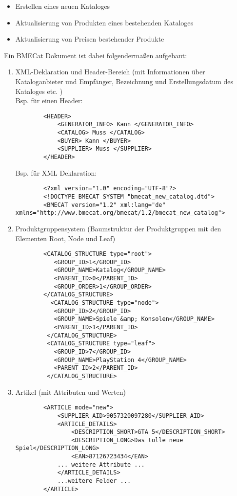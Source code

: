 \begin{itemize}
\item Erstellen eines neuen Kataloges
\item Aktualisierung von Produkten eines bestehenden Kataloges
\item Aktualisierung von Preisen bestehender Produkte
\end{itemize}



Ein BMECat Dokument ist dabei folgendermaßen aufgebaut:
	
	\begin{enumerate}
	
		\item XML-Deklaration und Header-Bereich (mit Informationen über Kataloganbieter und Empfänger, Bezeichnung und Erstellungsdatum des Kataloges etc.  )
			\\Bsp. für einen Header:
		\begin{lstlisting}
		<HEADER>
			<GENERATOR_INFO> Kann </GENERATOR_INFO>
			<CATALOG> Muss </CATALOG>
			<BUYER> Kann </BUYER>
			<SUPPLIER> Muss </SUPPLIER>
		</HEADER>
		\end{lstlisting}
		Bsp. für XML Deklaration:
		\begin{lstlisting}
		<?xml version="1.0" encoding="UTF-8"?>
		<!DOCTYPE BMECAT SYSTEM "bmecat_new_catalog.dtd">
		<BMECAT version="1.2" xml:lang="de" xmlns="http://www.bmecat.org/bmecat/1.2/bmecat_new_catalog">
		\end{lstlisting}
		\item Produktgruppensystem (Baumstruktur der Produktgruppen mit den Elementen Root, Node und Leaf)
		\begin{lstlisting}
		<CATALOG_STRUCTURE type="root">
		   <GROUP_ID>1</GROUP_ID>
		   <GROUP_NAME>Katalog</GROUP_NAME>
		   <PARENT_ID>0</PARENT_ID>
		   <GROUP_ORDER>1</GROUP_ORDER>
		</CATALOG_STRUCTURE>
		  <CATALOG_STRUCTURE type="node">
		   <GROUP_ID>2</GROUP_ID>
		   <GROUP_NAME>Spiele &amp; Konsolen</GROUP_NAME>
		   <PARENT_ID>1</PARENT_ID>
		 </CATALOG_STRUCTURE>
		 <CATALOG_STRUCTURE type="leaf">
		   <GROUP_ID>7</GROUP_ID>
		   <GROUP_NAME>PlayStation 4</GROUP_NAME>
		   <PARENT_ID>2</PARENT_ID>
		 </CATALOG_STRUCTURE>
		\end{lstlisting}
		
		
		
		\item Artikel (mit Attributen und Werten)
		
		\begin{lstlisting}
		<ARTICLE mode="new">
			<SUPPLIER_AID>9057320097280</SUPPLIER_AID>
			<ARTICLE_DETAILS>
			   	<DESCRIPTION_SHORT>GTA 5</DESCRIPTION_SHORT>
				<DESCRIPTION_LONG>Das tolle neue Spiel</DESCRIPTION_LONG>
				<EAN>87126723434</EAN>
			... weitere Attribute ...
			</ARTICLE_DETAILS>
			...weitere Felder ...
		</ARTICLE>
		\end{lstlisting}
		


\end{enumerate}
